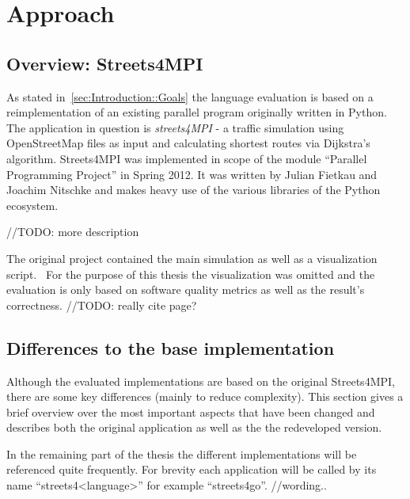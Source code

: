 \chapter{Approach}
\label{chap:Approach}


\section{Overview: Streets4MPI}
\label{sec:Approach::Overview}

As stated in~\autoref{sec:Introduction::Goals} the language evaluation is based on a reimplementation of an existing parallel program originally written in Python. The application in question is \textit{streets4MPI} - a traffic simulation using OpenStreetMap files as input and calculating shortest routes via Dijkstra's algorithm. Streets4MPI was implemented in scope of the module ``Parallel Programming Project'' in Spring 2012. It was written by Julian Fietkau and Joachim Nitschke and makes heavy use of the various libraries of the Python ecosystem.

//TODO: more description

The original project contained the main simulation as well as a visualization script.~\cite[p.~3]{streets_report} For the purpose of this thesis the visualization was omitted and the evaluation is only based on software quality metrics as well as the result's correctness. //TODO: really cite page?

\section{Differences to the base implementation}
\label{sec:Approach::Differences}

Although the evaluated implementations are based on the original Streets4MPI, there are some key differences (mainly to reduce complexity). This section gives a brief overview over the most important aspects that have been changed and describes both the original application as well as the the redeveloped version.

In the remaining part of the thesis the different implementations will be referenced quite frequently. For brevity each application will be called by its name ``streets4<language>'' for example ``streets4go''. //wording..

